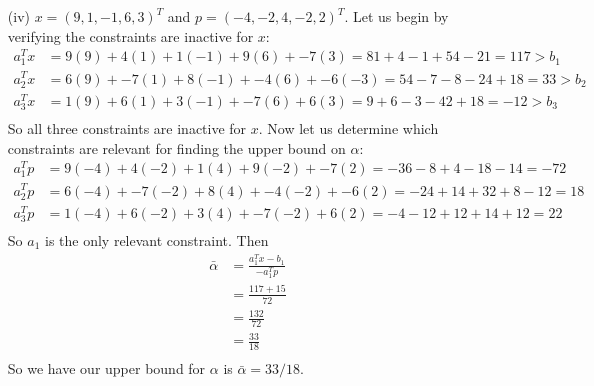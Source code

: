 \documentclass{article}
\begin{document}
\begin{itemize}
        \item[(iv)] $x = (9,1,-1,6,3)^T$ and $p = (-4,-2,4,-2,2)^T$.
        \newline\newline
        Let us begin by verifying the constraints are inactive for $x$:
        \begin{align*}
            a_1^Tx &= 9(9) + 4(1) + 1(-1) + 9(6) + -7(3) = 81 + 4 - 1 + 54 - 21 = 117 > b_1\\
            a_2^Tx &= 6(9) + -7(1) + 8(-1) + -4(6) + -6(-3) = 54 - 7 - 8 - 24 + 18 = 33 > b_2\\
            a_3^Tx &= 1(9) + 6(1) + 3(-1) + -7(6) + 6(3) = 9 + 6 - 3 - 42 + 18 = -12 > b_3\\
        \end{align*}
        So all three constraints are inactive for $x$. Now let us determine which constraints are relevant for finding the upper bound on $\alpha$:
        \begin{align*}
            a_1^Tp &= 9(-4) + 4(-2) + 1(4) + 9(-2) + -7(2) = -36 - 8 + 4 - 18 - 14 = -72\\
            a_2^Tp &= 6(-4) + -7(-2) + 8(4) + -4(-2) + -6(2) = -24 + 14 + 32 + 8 - 12 = 18\\
            a_3^Tp &= 1(-4) + 6(-2) + 3(4) + -7(-2) + 6(2) = -4 - 12 + 12 + 14 + 12 = 22\\
        \end{align*}
        So $a_1$ is the only relevant constraint. Then
        \begin{align*}
            \bar{\alpha} &= \frac{a_1^Tx - b_1}{-a_1^Tp}\\
            &= \frac{117 + 15}{72} \\
            &= \frac{132}{72} \\
            &= \frac{33}{18} \\
        \end{align*}
        So we have our upper bound for $\alpha$ is $\bar{\alpha} = 33/18$.
        
    \end{itemize}
\end{document}
